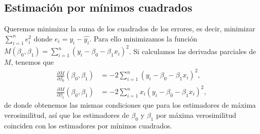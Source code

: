 \subsection{Estimación por mínimos cuadrados}
\noindent Queremos minimizar la suma de los cuadrados de los errores, es decir, minimizar $\sum_{i=1}^n e_i^2$  donde $e_i = y_i - \hat{y_i}$. Para ello minimizamos la función $M(\beta_0, \beta_1) = \sum_{i=1}^n (y_i - \beta_0 - \beta_1x_i)^2$. Si calculamos las derivadas parciales de $M$, tenemos que
\begin{align*}
    \frac{\partial M}{\partial \beta_0}(\beta_0,\beta_1) &= -2\sum_{i=1}^n (y_i - \beta_0 - \beta_1x_i)^2, \\
    \frac{\partial M}{\partial \beta_1}(\beta_0,\beta_1) &= -2\sum_{i=1}^n x_i(y_i - \beta_0 - \beta_1x_i)^2,
\end{align*}
de donde obtenemos las mismas condiciones que para los estimadores de máxima verosimilitud, así que los estimadores de $\beta_0$ y $\beta_1$ por máxima verosimilitud coinciden con los estimadores por mínimos cuadrados.

